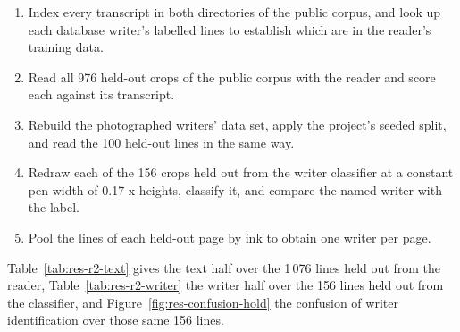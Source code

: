         \medskip

        \begin{enumerate}
        \item Index every transcript in both directories of the public corpus,
              and look up each database writer's labelled lines to establish
              which are in the reader's training data.
        \item Read all 976 held-out crops of the public corpus with the reader
              and score each against its transcript.
        \item Rebuild the photographed writers' data set, apply the project's
              seeded split, and read the 100 held-out lines in the same way.
        \item Redraw each of the 156 crops held out from the writer classifier
              at a constant pen width of 0.17 x-heights, classify it, and
              compare the named writer with the label.
        \item Pool the lines of each held-out page by ink to obtain one writer
              per page.
        \end{enumerate}

        \medskip

        Table~\ref{tab:res-r2-text} gives the text half over the 1\,076 lines
        held out from the reader, Table~\ref{tab:res-r2-writer} the writer half
        over the 156 lines held out from the classifier, and
        Figure~\ref{fig:res-confusion-hold} the confusion of writer
        identification over those same 156 lines.

